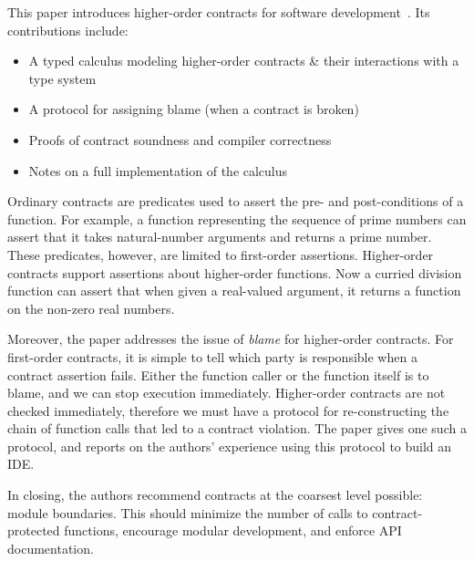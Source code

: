 \documentclass{article}
\begin{document}

This paper introduces higher-order contracts for software development~\cite{ff-contracts}.
Its contributions include:
\begin{itemize}
\item A typed calculus modeling higher-order contracts \& their interactions with a type system
\item A protocol for assigning blame (when a contract is broken)
\item Proofs of contract soundness and compiler correctness
\item Notes on a full implementation of the calculus
\end{itemize}

\qquad Ordinary contracts are predicates used to assert the pre- and post-conditions of a function.
For example, a function representing the sequence of prime numbers can assert that it takes natural-number arguments and returns a prime number.
These predicates, however, are limited to first-order assertions.
Higher-order contracts support assertions about higher-order functions.
Now a curried division function can assert that when given a real-valued argument, it returns a function on the non-zero real numbers.

\qquad Moreover, the paper addresses the issue of \emph{blame} for higher-order contracts.
For first-order contracts, it is simple to tell which party is responsible when a contract assertion fails.
Either the function caller or the function itself is to blame, and we can stop execution immediately.
Higher-order contracts are not checked immediately, therefore we must have a protocol for re-constructing the chain of function calls that led to a contract violation.
The paper gives one such a protocol, and reports on the authors' experience using this protocol to build an IDE.

\qquad In closing, the authors recommend contracts at the coarsest level possible: module boundaries.
This should minimize the number of calls to contract-protected functions, encourage modular development, and enforce API documentation.

\end{document}
